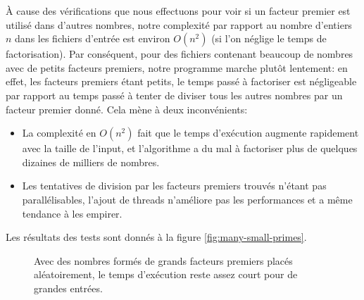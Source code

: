 \documentclass[a4paper,10pt]{article}
\begin{document}
À cause des vérifications que nous effectuons pour voir si un facteur premier est utilisé dans d'autres nombres, notre complexité par rapport au nombre d'entiers $n$ dans les fichiers d'entrée est environ $O(n^2)$ (si l'on néglige le temps de factorisation). Par conséquent, pour des fichiers contenant beaucoup de nombres avec de petits facteurs premiers, notre programme marche plutôt lentement: en effet, les facteurs premiers étant petits, le temps passé à factoriser est négligeable par rapport au temps passé à tenter de diviser tous les autres nombres par un facteur premier donné. Cela mène à deux inconvénients:
\begin{itemize}
    \item La complexité en $O(n^2)$ fait que le temps d'exécution augmente rapidement avec la taille de l'input, et l'algorithme a du mal à factoriser plus de quelques dizaines de milliers de nombres.
    \item Les tentatives de division par les facteurs premiers trouvés n'étant pas parallélisables, l'ajout de threads n'améliore pas les performances et a même tendance à les empirer.
\end{itemize}

Les résultats des tests sont donnés à la figure \ref{fig:many-small-primes}.

\begin{figure}[h!]
    \centering
    \caption{Avec des nombres formés de grands facteurs premiers placés aléatoirement, le temps d'exécution reste assez court pour de grandes entrées.}
    \label{fig:large-primes}
\end{figure}
\end{document}
